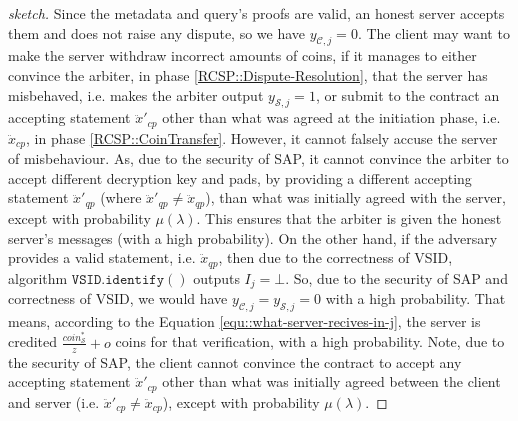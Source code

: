 \begin{proof}[sketch]
  Since the metadata and query's proofs are valid, an honest server accepts them and does not raise any dispute, so we have $y_{\scriptscriptstyle\mathcal{C},j}=0$.  The client may want to  make the server  withdraw incorrect amounts of coins, if it manages to either convince the arbiter, in phase \ref{RCSP::Dispute-Resolution}, that the server has misbehaved, i.e. makes the arbiter output $y_{\scriptscriptstyle\mathcal{S},j}=1$, or submit to the contract  an accepting  statement $\ddot{x}'_{\scriptscriptstyle cp}$ other than what was agreed at the initiation phase, i.e. $\ddot{x}_{\scriptscriptstyle cp}$, in phase \ref{RCSP::CoinTransfer}. However, it cannot falsely accuse the server of misbehaviour. As,  due to the security of SAP, it cannot  convince the arbiter to accept different decryption key and pads, by providing a different accepting statement $\ddot{x}'_{\scriptscriptstyle qp}$  (where $\ddot{x}'_{\scriptscriptstyle qp}\neq \ddot{x}_{\scriptscriptstyle qp}$), than what was initially agreed with the server, except with  probability $\mu(\lambda)$. This ensures that  the arbiter is given the honest server's messages (with a high probability). On the other hand, if the adversary provides a valid statement, i.e. $\ddot{x}_{\scriptscriptstyle qp}$, then due to the correctness of VSID, algorithm $\mathtt{VSID.identify}()$ outputs $I_{\scriptscriptstyle j}=\bot$. So, due to the security of SAP and correctness of VSID,  we would have $y_{\scriptscriptstyle\mathcal{C},j}=y_{\scriptscriptstyle\mathcal{S},j}=0$ with a high probability.  That means, according to the Equation \ref{equ::what-server-recives-in-j}, the server is credited $\frac{coin_{\scriptscriptstyle\mathcal S}^{\scriptscriptstyle*}}{z}+o$ coins for that verification, with a  high probability. Note,  due to the security of SAP, the client cannot convince the contract to accept any accepting statement $\ddot{x}'_{\scriptscriptstyle cp}$ other than what was initially agreed  between the client and server (i.e. $\ddot{x}'_{\scriptscriptstyle cp}\neq \ddot{x}_{\scriptscriptstyle cp}$), except with   probability $\mu(\lambda)$.  
  
%     
%    
    

\end{proof}
